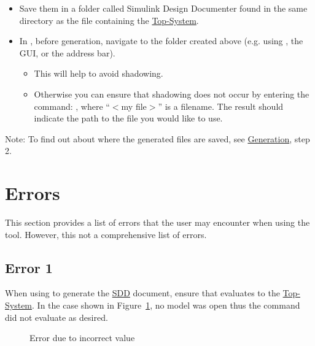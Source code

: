 \documentclass{mcscert}
\newcommand{\sddtool}{Simulink Design Documenter}
\newcommand{\topsystemnolink}{Top-System} %
\newcommand{\topsystem}{\hyperref[def:topsystem]{\topsystemnolink{}}}
\begin{document}
\begin{itemize}
	\item Save them in a folder called \sddtool{} found in the same directory as the file containing the \topsystem{}.
	\item In \matlab{}, before generation, navigate to the folder created above (e.g. using , the GUI, or the address bar).
	\begin{itemize}
		\item This will help to avoid shadowing.
		\item Otherwise you can ensure that shadowing does not occur by entering the command: , where ``$<$my file$>$'' is a filename. 
		The result should indicate the path to the file you would like to use.
	\end{itemize}
\end{itemize}
  
Note: To find out about where the generated files are saved, see  \hyperref[sec:generation]{Generation}, step 2.

\section{Errors}
This section provides a list of errors that the user may encounter when using the tool. 
However, this not a comprehensive list of errors.
        
	\subsection*{Error 1}
	When using  to generate the \hyperref[acr:sdd]{SDD} document, ensure that  evaluates to the \topsystem{}. 
	In the case shown in Figure~\ref{fig:error1}, no model was open thus the  command did not evaluate as desired.

	\begin{figure}\centering
		\caption{Error due to incorrect  value}
		\label{fig:error1}
	\end{figure}
\end{document}

